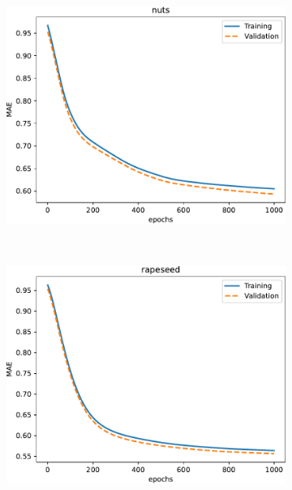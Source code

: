 \documentclass[journal,article,submit,pdftex,moreauthors]{Definitions/mdpi}
\begin{document}
\begin{figure}[H]
\begin{subfigure}[t]{0.3\textwidth}
		\includegraphics[width=\linewidth]{figures/results_040923/loss_nuts.pdf}
	\caption{}
	\label{fig:loss_nuts}
	\end{subfigure}\\[0.2cm]
	\begin{subfigure}[t]{0.3\textwidth}
		\includegraphics[width=\linewidth]{figures/results_040923/loss_rapeseed.pdf}
	\caption{}
	\label{fig:loss_rapeseed}
	\end{subfigure}\hfill
	\begin{subfigure}[t]{0.3\textwidth}

\end{subfigure}
\end{figure}
\end{document}
